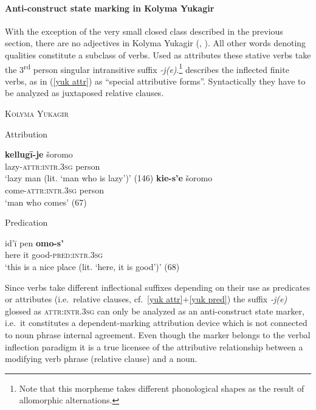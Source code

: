 \paragraph{Anti-construct state marking in Kolyma Yukagir}
With the exception of the very small closed class described in the previous section, there are no adjectives in Kolyma Yukagir (\citealt[79–112]{krejnovic1982}, \citealt[66–69, 145–147]{maslova2003b}). All other words denoting qualities constitute a subclass of verbs. Used as attributes these stative verbs take the 3\textsuperscript{rd} person singular intransitive suffix \mbox{\textit{-j(e)}}.\footnote{Note that this morpheme takes different phonological shapes as the result of allomorphic alternations.} \citet[66, elsewhere]{maslova2003b} describes the inflected finite verbs, as in (\ref{yuk attr}) as “special attributive forms”. Syntactically they have to be analyzed as juxtaposed relative clauses.

\begin{exe}
\ex 	\textsc{Kolyma Yukagir} \citep{maslova2003b}
\begin{xlist}
\ex Attribution \label{yuk attr}
\begin{xlist}
\ex
\gll 	\textbf{kellugī-je} šoromo\\
	lazy-\textsc{attr:intr.3sg} person\\
\glt	‘lazy man (lit. ‘man who is lazy’)’ (146)
\ex
\gll	\textbf{kie-s'e} šoromo\\
	come-\textsc{attr:intr.3sg} person\\
\glt	‘man who comes’ (67)
\end{xlist}
\ex Predication \label{yuk pred}
\begin{xlist}
\ex
\gll 	id'ī pen \textbf{omo-s'}\\
	here it good-\textsc{pred:intr.3sg}\\
\glt	‘this is a nice place (lit. ‘here, it is good’)’ (68)
\end{xlist}
\end{xlist}
\end{exe}
Since verbs take different inflectional suffixes depending on their use as predicates or attributes (i.e.~relative clauses, cf.~\ref{yuk attr}+\ref{yuk pred}) the suffix \textit{-j(e)} glossed as \textsc{attr:intr.3sg} can only be analyzed as an anti-construct state marker, i.e.~it constitutes a depend\-ent-marking attribution device which is not connected to noun phrase internal agreement. Even though the marker belongs to the verbal inflection paradigm it is a true licensee of the attributive relationship between a modifying verb phrase (relative clause) and a noun.

